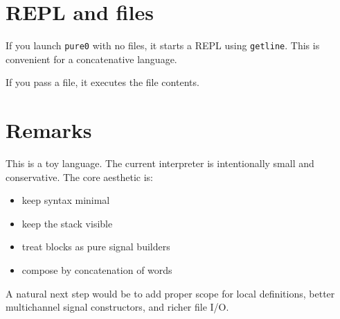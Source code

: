 \documentclass[11pt]{article}
\begin{document}
\section*{REPL and files}
If you launch \texttt{pure0} with no files, it starts a REPL using \texttt{getline}. This is convenient for a concatenative language.

If you pass a file, it executes the file contents.

\section*{Remarks}
This is a toy language. The current interpreter is intentionally small and conservative. The core aesthetic is:
\begin{itemize}
\item keep syntax minimal
\item keep the stack visible
\item treat blocks as pure signal builders
\item compose by concatenation of words
\end{itemize}

A natural next step would be to add proper scope for local definitions, better multichannel signal constructors, and richer file I/O.
\end{document}
